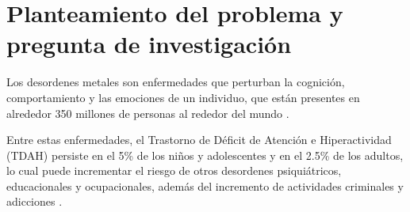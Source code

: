 \section{Planteamiento del problema y pregunta de investigación}


Los desordenes metales son enfermedades que perturban la cognición, comportamiento y las emociones de un individuo, que están presentes en alrededor 350 millones de personas al rededor del mundo \cite{Dehghan-Bonari2023}. 

Entre estas enfermedades, el Trastorno de Déficit de Atención e Hiperactividad (TDAH) persiste en el 5\% de los niños y adolescentes y en el 2.5\% de los adultos, lo cual puede incrementar el riesgo de otros desordenes psiquiátricos, educacionales y ocupacionales, además  del incremento de actividades criminales y adicciones \cite{Faraone2015}.

